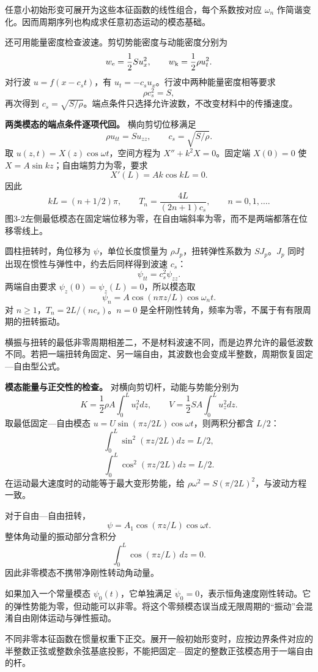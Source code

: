 \documentclass[12pt,a4paper,UTF8]{ctexart}
\begin{document}
任意小初始形变可展开为这些本征函数的线性组合，每个系数按对应
\(\omega_n\) 作简谐变化。因而周期序列也构成求任意初态运动的模态基础。

还可用能量密度检查波速。剪切势能密度与动能密度分别为 \[
w_{\rm e}=\frac12S u_x^2,\qquad
w_{\rm k}=\frac12\rho u_t^2.
\] 对行波 \(u=f(x-c_st)\)，有
\(u_t=-c_su_x\)。行波中两种能量密度相等要求 \[
\rho c_s^2=S,
\] 再次得到
\(c_s=\sqrt{S/\rho}\)。端点条件只选择允许波数，不改变材料中的传播速度。

\textbf{两类模态的端点条件逐项代回。} 横向剪切位移满足 \[
\rho u_{tt}=S u_{zz},\qquad c_s=\sqrt{S/\rho}.
\] 取 \(u(z,t)=X(z)\cos\omega t\)，空间方程为 \(X''+k^2X=0\)。固定端
\(X(0)=0\) 使 \(X=A\sin kz\)；自由端剪力为零，要求 \[
X'(L)=Ak\cos kL=0.
\] 因此 \[
kL=(n+1/2)\pi,\qquad
T_n=\frac{4L}{(2n+1)c_s},\qquad n=0,1,\ldots.
\]
图3-2左侧最低模态在固定端位移为零，在自由端斜率为零，而不是两端都落在位移零线上。

圆柱扭转时，角位移为 \(\psi\)，单位长度惯量为
\(\rho J_p\)，扭转弹性系数为 \(S J_p\)。\(J_p\)
同时出现在惯性与弹性中，约去后同样得到波速 \(c_s\)： \[
\psi_{tt}=c_s^2\psi_{zz}.
\] 两端自由要求 \(\psi_z(0)=\psi_z(L)=0\)，所以模态取 \[
\psi_n=A\cos(n\pi z/L)\cos\omega_nt.
\] 对 \(n\ge1\)，\(T_n=2L/(nc_s)\)。\(n=0\)
是全杆刚性转角，频率为零，不属于有有限周期的扭转振动。

横振与扭转的最低非零周期相差二，不是材料波速不同，而是边界允许的最低波数不同。若把一端扭转角固定、另一端自由，其波数也会变成半整数，周期恢复固定---自由型公式。

\textbf{模态能量与正交性的检查。} 对横向剪切杆，动能与势能分别为 \[
K=\frac12\rho A\int_0^L u_t^2dz,
\qquad V=\frac12SA\int_0^L u_z^2dz.
\] 取最低固定---自由模态 \(u=U\sin(\pi z/2L)\cos\omega t\)，则两积分都含
\(L/2\)： \[
\int_0^L\sin^2(\pi z/2L)dz=L/2,
\] \[
\int_0^L\cos^2(\pi z/2L)dz=L/2.
\] 在运动最大速度时的动能等于最大变形势能，给
\(\rho\omega^2=S(\pi/2L)^2\)，与波动方程一致。

对于自由---自由扭转， \[
\psi=A_1\cos(\pi z/L)\cos\omega t.
\] 整体角动量的振动部分含积分 \[
\int_0^L\cos(\pi z/L)\,dz=0.
\] 因此非零模态不携带净刚性转动角动量。

如果加入一个常量模态 \(\psi_0(t)\)，它单独满足
\(\ddot\psi_0=0\)，表示恒角速度刚性转动。它的弹性势能为零，但动能可以非零。将这个零频模态误当成无限周期的``振动''会混淆自由刚体运动与弹性振动。

不同非零本征函数在惯量权重下正交。展开一般初始形变时，应按边界条件对应的半整数正弦或整数余弦基底投影，不能把固定---固定的整数正弦模态用于一端自由的杆。
\end{document}
